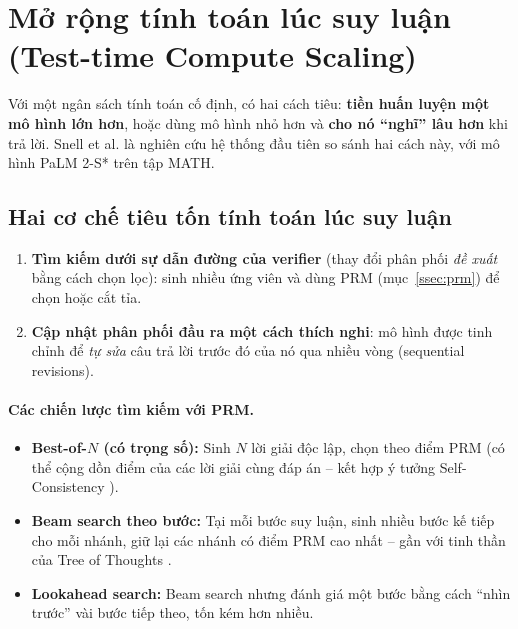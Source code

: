 
\section{Mở rộng tính toán lúc suy luận (Test-time Compute Scaling)}
\label{sec:test_time_compute}

Với một ngân sách tính toán cố định, có hai cách tiêu: \textbf{tiền huấn luyện một mô hình lớn hơn}, hoặc dùng mô hình nhỏ hơn và \textbf{cho nó “nghĩ” lâu hơn} khi trả lời. Snell et al. \cite{snell2024scaling} là nghiên cứu hệ thống đầu tiên so sánh hai cách này, với mô hình PaLM 2-S* trên tập MATH.

\subsection{Hai cơ chế tiêu tốn tính toán lúc suy luận}
\label{ssec:ttc_mechanisms}
\begin{enumerate}
	\item \textbf{Tìm kiếm dưới sự dẫn đường của verifier} (thay đổi phân phối \emph{đề xuất} bằng cách chọn lọc): sinh nhiều ứng viên và dùng PRM (mục~\ref{ssec:prm}) để chọn hoặc cắt tỉa.
	\item \textbf{Cập nhật phân phối đầu ra một cách thích nghi}: mô hình được tinh chỉnh để \emph{tự sửa} câu trả lời trước đó của nó qua nhiều vòng (sequential revisions).
\end{enumerate}

\paragraph{Các chiến lược tìm kiếm với PRM.}
\begin{itemize}
	\item \textbf{Best-of-$N$ (có trọng số):} Sinh $N$ lời giải độc lập, chọn theo điểm PRM (có thể cộng dồn điểm của các lời giải cùng đáp án -- kết hợp ý tưởng Self-Consistency \cite{wang2022self}).
	\item \textbf{Beam search theo bước:} Tại mỗi bước suy luận, sinh nhiều bước kế tiếp cho mỗi nhánh, giữ lại các nhánh có điểm PRM cao nhất -- gần với tinh thần của Tree of Thoughts \cite{yao2023tree}.
	\item \textbf{Lookahead search:} Beam search nhưng đánh giá một bước bằng cách “nhìn trước” vài bước tiếp theo, tốn kém hơn nhiều.
\end{itemize}

